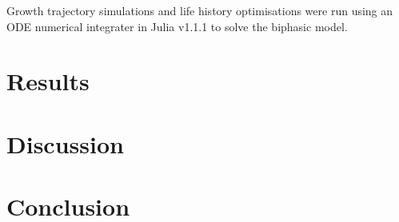 \documentclass[a4paper]{article} %
\begin{document}
Growth trajectory simulations and life history optimisations were run using an ODE numerical integrater in Julia v1.1.1 \autocite{Bezanson2017} to solve the biphasic model.
\section{Results}\thispagestyle{empty}
\lipsum

\section{Discussion}\thispagestyle{empty}
\lipsum

\section{Conclusion}\thispagestyle{empty}
\lipsum

\newpage\let\mkbibnamefamily\textsc\printbibliography[title=Bibliography]\thispagestyle{empty} %

% 
\end{document}
